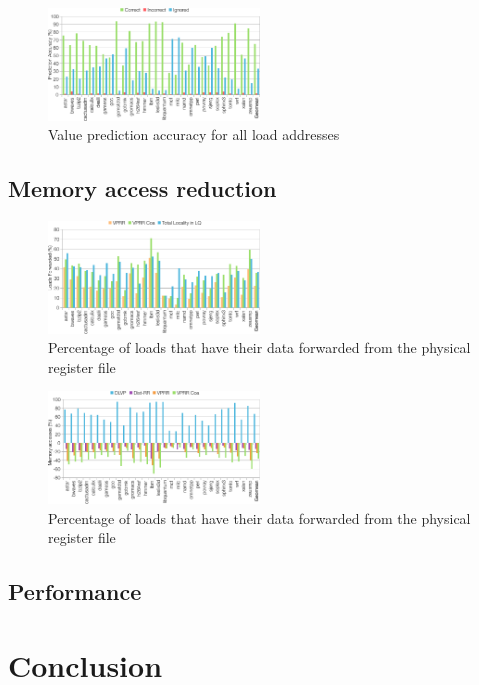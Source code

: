 \documentclass{sig-alternate}
\begin{document}
\begin{figure}[ht]
\centerline{\includegraphics[width=0.50\textwidth]{graphs/ValuePredAccuracy.pdf}}
\caption{Value prediction accuracy for all load addresses}
\label{fig:VPAccuracy}
\end{figure}

\subsection{Memory access reduction}

\begin{figure}[ht]
\centerline{\includegraphics[width=0.50\textwidth]{graphs/RegisterReuse.pdf}}
\caption{Percentage of loads that have their data forwarded from the physical register file}
\label{fig:Reuse}
\end{figure}


\begin{figure}[ht]
\centerline{\includegraphics[width=0.50\textwidth]{graphs/MemReduction.pdf}}
\caption{Percentage of loads that have their data forwarded from the physical register file}
\label{fig:MemReduction}
\end{figure}


\subsection{Performance}















\section{Conclusion}




\end{document}
